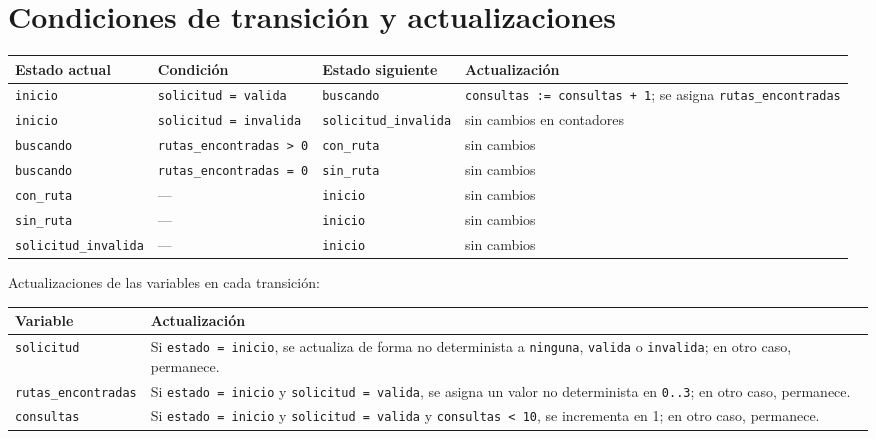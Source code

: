 \documentclass[11pt,a4paper]{article}
\begin{document}
\section{Condiciones de transición y actualizaciones}

\begin{center}
\begin{tabular}{|p{2.4cm}|p{4.6cm}|p{2.6cm}|p{4.6cm}|}
\hline
\textbf{Estado actual} & \textbf{Condición} & \textbf{Estado siguiente} & \textbf{Actualización} \\
\hline
\texttt{inicio} & \texttt{solicitud = valida} & \texttt{buscando} & \texttt{consultas := consultas + 1}; se asigna \texttt{rutas\_encontradas} \\
\hline
\texttt{inicio} & \texttt{solicitud = invalida} & \texttt{solicitud\_invalida} & sin cambios en contadores \\
\hline
\texttt{buscando} & \texttt{rutas\_encontradas > 0} & \texttt{con\_ruta} & sin cambios \\
\hline
\texttt{buscando} & \texttt{rutas\_encontradas = 0} & \texttt{sin\_ruta} & sin cambios \\
\hline
\texttt{con\_ruta} & --- & \texttt{inicio} & sin cambios \\
\hline
\texttt{sin\_ruta} & --- & \texttt{inicio} & sin cambios \\
\hline
\texttt{solicitud\_invalida} & --- & \texttt{inicio} & sin cambios \\
\hline
\end{tabular}
\end{center}

Actualizaciones de las variables en cada transición:

\begin{center}
\begin{tabular}{|l|p{11cm}|}
\hline
\textbf{Variable} & \textbf{Actualización} \\
\hline
\texttt{solicitud} & Si \texttt{estado = inicio}, se actualiza de forma no determinista a \texttt{ninguna}, \texttt{valida} o \texttt{invalida}; en otro caso, permanece. \\
\hline
\texttt{rutas\_encontradas} & Si \texttt{estado = inicio} y \texttt{solicitud = valida}, se asigna un valor no determinista en \texttt{0..3}; en otro caso, permanece. \\
\hline
\texttt{consultas} & Si \texttt{estado = inicio} y \texttt{solicitud = valida} y \texttt{consultas < 10}, se incrementa en 1; en otro caso, permanece. \\
\hline
\end{tabular}
\end{center}
\end{document}
